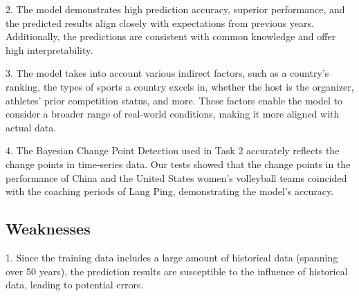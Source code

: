 \documentclass[12pt]{article}  %
\begin{document}
2. The model demonstrates high prediction accuracy, superior performance, and the predicted results align closely with expectations from previous years. Additionally, the predictions are consistent with common knowledge and offer high interpretability.

3. The model takes into account various indirect factors, such as a country's ranking, the types of sports a country excels in, whether the host is the organizer, athletes' prior competition status, and more. These factors enable the model to consider a broader range of real-world conditions, making it more aligned with actual data.

4. The Bayesian Change Point Detection used in Task 2 accurately reflects the change points in time-series data\cite{1}. Our tests showed that the change points in the performance of China and the United States women's volleyball teams coincided with the coaching periods of Lang Ping, demonstrating the model's accuracy.
\subsection{Weaknesses}
1. Since the training data includes a large amount of historical data (spanning over 50 years), the prediction results are susceptible to the influence of historical data, leading to potential errors.

 	
 	
\end{document}
